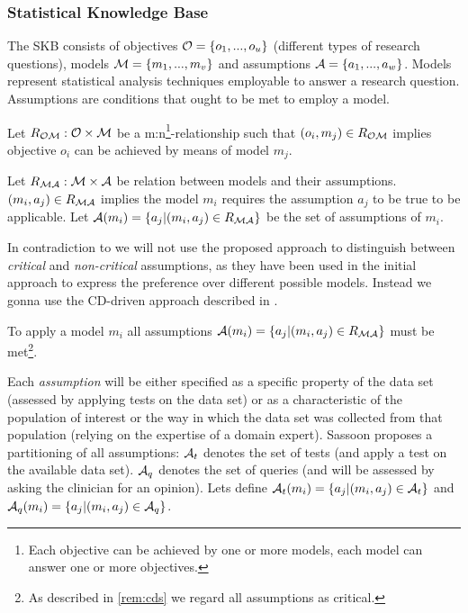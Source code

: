 \subsubsection{Statistical Knowledge Base}
\label{sub:SKB}

The \gls{SKB} consists of objectives $\mathcal{O}=\{o_1, ..., o_u\}$ (different types of research questions), models $\mathcal{M}=\{m_1, ..., m_v\}$ and assumptions $\mathcal{A} = \{a_1, ..., a_w\}$. Models represent statistical analysis techniques employable to answer a research question. Assumptions are conditions that ought to be met to employ a model.

\begin{definition}
	Let $R_{\mathcal{O}\mathcal{M}}: \mathcal{O} \times \mathcal{M}$ be a m:n\footnote{Each objective can be achieved by one or more models, each model can answer one or more objectives.}-relationship such that $(o_i, m_j)\in R_{\mathcal{O}\mathcal{M}}$ implies objective $o_i$ can be achieved by means of model $m_j$. 
\end{definition}

\begin{definition}
	Let $R_{\mathcal{M}\mathcal{A}}: \mathcal{M} \times \mathcal{A}$ be relation between models and their assumptions. $(m_i, a_j)\in R_{\mathcal{M}\mathcal{A}}$ implies  the model $m_i$ requires the assumption $a_j$ to be true to be applicable. Let $\mathcal{A}(m_i) = \{a_j | (m_i, a_j) \in R_{\mathcal{M}\mathcal{A}}\}$ be the set of assumptions of $m_i$.
\end{definition}

\begin{remark}
In contradiction to \cite{sassoon2014} we will not use the proposed approach to distinguish between \textit{critical} and \textit{non-critical} assumptions, as they have been used in the initial approach to express the preference over different possible models. Instead we gonna use the \gls{CD}-driven approach described in \cite{sassoon2016CD}.
\label{rem:cds}
\end{remark}


\begin{definition}
To apply a model $m_i$ all assumptions $\mathcal{A}(m_i) = \{a_j | (m_i, a_j) \in R_{\mathcal{M}\mathcal{A}} \}$ must be met\footnote{As described in \autoref{rem:cds} we regard all assumptions as critical.}.
\end{definition}

Each \textit{assumption} will be either specified as a specific property of the data set (assessed by applying tests on the data set) or as a characteristic of the population of interest or the way in which the data set was collected from that population (relying on the expertise of a domain expert). Sassoon proposes a partitioning of all assumptions: $\mathcal{A}_t$ denotes the set of tests (and apply a test on the available data set). $\mathcal{A}_q$ denotes the set of queries (and will be assessed by asking the clinician for an opinion). Lets define $\mathcal{A}_t(m_i)= \{a_j| (m_i, a_j) \in \mathcal{A}_t\}$ and $\mathcal{A}_q(m_i)= \{a_j| (m_i, a_j) \in \mathcal{A}_q\}$. 

